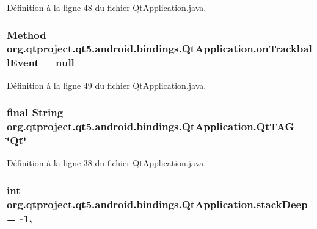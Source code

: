 Définition à la ligne 48 du fichier Qt\-Application.\-java.

\hypertarget{classorg_1_1qtproject_1_1qt5_1_1android_1_1bindings_1_1_qt_application_aba0550a56d08380fb00cef9cc1a276d1}{
\subsubsection[{on\-Trackball\-Event}]{\setlength{\rightskip}{0pt plus 5cm}Method org.\-qtproject.\-qt5.\-android.\-bindings.\-Qt\-Application.\-on\-Trackball\-Event = null\hspace{0.3cm}{\ttfamily [static]}}}\label{classorg_1_1qtproject_1_1qt5_1_1android_1_1bindings_1_1_qt_application_aba0550a56d08380fb00cef9cc1a276d1}


Définition à la ligne 49 du fichier Qt\-Application.\-java.

\hypertarget{classorg_1_1qtproject_1_1qt5_1_1android_1_1bindings_1_1_qt_application_acf8f3131e19aaef5fc2079bc530f42d6}{
\subsubsection[{Qt\-T\-A\-G}]{\setlength{\rightskip}{0pt plus 5cm}final String org.\-qtproject.\-qt5.\-android.\-bindings.\-Qt\-Application.\-Qt\-T\-A\-G = \char`\"{}Qt\char`\"{}\hspace{0.3cm}{\ttfamily [static]}}}\label{classorg_1_1qtproject_1_1qt5_1_1android_1_1bindings_1_1_qt_application_acf8f3131e19aaef5fc2079bc530f42d6}


Définition à la ligne 38 du fichier Qt\-Application.\-java.

\hypertarget{classorg_1_1qtproject_1_1qt5_1_1android_1_1bindings_1_1_qt_application_aaf646148d88d3e301dab76cd7e4e0c04}{
\subsubsection[{stack\-Deep}]{\setlength{\rightskip}{0pt plus 5cm}int org.\-qtproject.\-qt5.\-android.\-bindings.\-Qt\-Application.\-stack\-Deep = -\/1\hspace{0.3cm}{\ttfamily [static]}, {\ttfamily [private]}}}\label{classorg_1_1qtproject_1_1qt5_1_1android_1_1bindings_1_1_qt_application_aaf646148d88d3e301dab76cd7e4e0c04}


